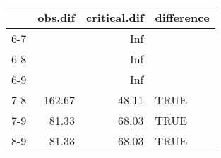 \begin{table}[ht]
\centering
\begin{tabular}{rrrl}
  \hline
 & obs.dif & critical.dif & difference \\ 
  \hline
6-7 &  & Inf &  \\ 
  6-8 &  & Inf &  \\ 
  6-9 &  & Inf &  \\ 
  7-8 & 162.67 & 48.11 & TRUE \\ 
  7-9 & 81.33 & 68.03 & TRUE \\ 
  8-9 & 81.33 & 68.03 & TRUE \\ 
   \hline
\end{tabular}
\end{table}
